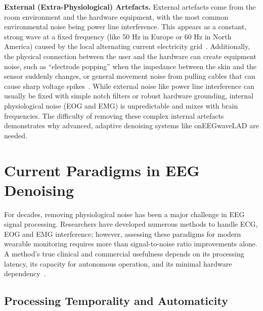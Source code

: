 \documentclass[MScCS,12pt,oneside,final]{uccthesis}
\begin{document}
        \textbf{External (Extra-Physiological) Artefacts.} External artefacts come from the room environment and the hardware equipment, with the most common environmental noise being power line interference. This appears as a constant, strong wave at a fixed frequency (like 50 Hz in Europe or 60 Hz in North America) caused by the local alternating current electricity grid~\parencite{teplan2002fundamentals}. Additionally, the physical connection between the user and the hardware can create equipment noise, such as ``electrode popping'' when the impedance between the skin and the sensor suddenly changes, or general movement noise from pulling cables that can cause sharp voltage spikes~\parencite{kappenman2010impedance}. While external noise like power line interference can usually be fixed with simple notch filters or robust hardware grounding, internal physiological noise (EOG and EMG) is unpredictable and mixes with brain frequencies. The difficulty of removing these complex internal artefacts demonstrates why advanced, adaptive denoising systems like onEEGwaveLAD are needed.

            
    \section{Current Paradigms in EEG Denoising}
    \label{sec:current_paradigms}
    
    For decades, removing physiological noise has been a major challenge in EEG signal processing. Researchers have developed numerous methods to handle ECG, EOG and EMG interference; however, assessing these paradigms for modern wearable monitoring requires more than signal-to-noise ratio improvements alone. A method's true clinical and commercial usefulness depends on its processing latency, its capacity for autonomous operation, and its minimal hardware dependency~\parencite{jiang2019removal}.

        \subsection{Processing Temporality and Automaticity}
\label{subsec:processing_temporality}
\end{document}
